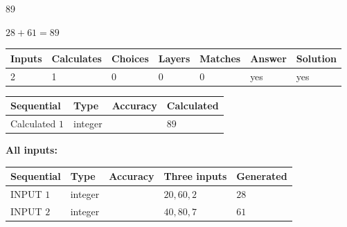 \documentclass[12pt]{article}
\begin{document}
 

89
 
 
\noindent{}
 
 

 
 
 
\noindent{}
 
 

$ %
28 +  %
61=   %
89$
 
 
\noindent{}
 
 

 
   
   
   
   
\noindent\begin{tabular}{|l|l|l|l|l|l|l|}
 \hline
Inputs & Calculates & Choices & Layers & Matches & Answer & Solution \\ \hline
 2  & 
 1  & 
 0
  & 
 0  & 
 0  & 
  yes & 
  yes 
  \\ \hline
 \end{tabular}
   
   
   
   
\noindent{}
   
   
  
  
\noindent\begin{tabular}{|l|l|l|l|}
\hline
 Sequential & Type & Accuracy & Calculated \\ 
\hline
 
 
  Calculated $  1 $ & integer &  & 
  $ 89 $ 
 \\  \hline  
 \end{tabular}
   
   
   
   
\noindent\vspace{0.1in}\hspace{-0.08in} {\textbf{\Large{All inputs: }}}
   
   
  
  
\noindent\begin{tabular}{|l|l|l|l|l|}
\hline
 Sequential & Type & Accuracy & Three inputs & Generated \\ 
\hline
 
 
  INPUT $  1 $ & integer &  & $
 20
 , 
 60
 , 
 2
 $ & $ 28 $ 
 \\  \hline  
 
 
  INPUT $  2 $ & integer &  & $
 40
 , 
 80
 , 
 7
 $ & $ 61 $ 
 \\  \hline  
 \end{tabular}
   
\end{document}
